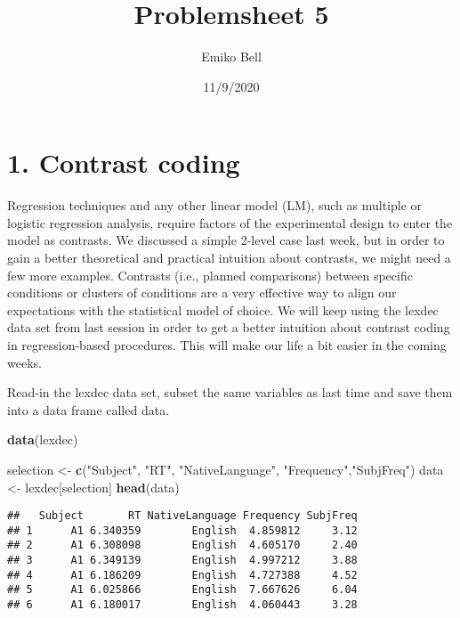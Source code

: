 \documentclass[
]{article}
\title{Problemsheet 5}
\author{Emiko Bell}
\date{11/9/2020}
\newenvironment{Shaded}{\begin{snugshade}}{\end{snugshade}}
\newcommand{\KeywordTok}[1]{\textcolor[rgb]{0.13,0.29,0.53}{\textbf{#1}}}
\newcommand{\NormalTok}[1]{#1}
\newcommand{\StringTok}[1]{\textcolor[rgb]{0.31,0.60,0.02}{#1}}
\begin{document}
\maketitle

\hypertarget{contrast-coding}{%
\section{1. Contrast coding}\label{contrast-coding}}

Regression techniques and any other linear model (LM), such as multiple
or logistic regression analysis, require factors of the experimental
design to enter the model as contrasts. We discussed a simple 2-level
case last week, but in order to gain a better theoretical and practical
intuition about contrasts, we might need a few more examples. Contrasts
(i.e., planned comparisons) between specific conditions or clusters of
conditions are a very effective way to align our expectations with the
statistical model of choice. We will keep using the lexdec data set from
last session in order to get a better intuition about contrast coding in
regression-based procedures. This will make our life a bit easier in the
coming weeks.

Read-in the lexdec data set, subset the same variables as last time and
save them into a data frame called data.

\begin{Shaded}
\begin{Highlighting}[]
\KeywordTok{data}\NormalTok{(lexdec)}

\NormalTok{selection <-}\StringTok{ }\KeywordTok{c}\NormalTok{(}\StringTok{"Subject"}\NormalTok{, }\StringTok{"RT"}\NormalTok{, }\StringTok{"NativeLanguage"}\NormalTok{, }\StringTok{"Frequency"}\NormalTok{,}\StringTok{"SubjFreq"}\NormalTok{)}
\NormalTok{data <-}\StringTok{ }\NormalTok{lexdec[selection]}
\KeywordTok{head}\NormalTok{(data)}
\end{Highlighting}
\end{Shaded}

\begin{verbatim}
##   Subject       RT NativeLanguage Frequency SubjFreq
## 1      A1 6.340359        English  4.859812     3.12
## 2      A1 6.308098        English  4.605170     2.40
## 3      A1 6.349139        English  4.997212     3.88
## 4      A1 6.186209        English  4.727388     4.52
## 5      A1 6.025866        English  7.667626     6.04
## 6      A1 6.180017        English  4.060443     3.28
\end{verbatim}
\end{document}
